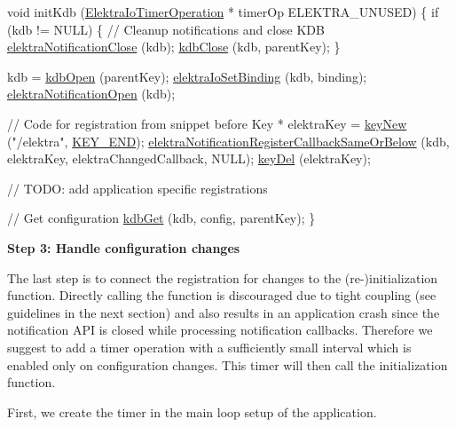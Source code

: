 \begin{DoxyCode}
\textcolor{keywordtype}{void} initKdb (\hyperlink{kdbio_8h_a09c40c890207a8244fc39bb930fee1fa}{ElektraIoTimerOperation} * timerOp ELEKTRA\_UNUSED)
\{
        \textcolor{keywordflow}{if} (kdb != NULL)
        \{
                \textcolor{comment}{// Cleanup notifications and close KDB}
                \hyperlink{group__kdbnotification_ga5685dafbd4131011365628d6d9213594}{elektraNotificationClose} (kdb);
                \hyperlink{group__kdb_gadb54dc9fda17ee07deb9444df745c96f}{kdbClose} (kdb, parentKey);
        \}

        kdb = \hyperlink{group__kdb_ga6808defe5870f328dd17910aacbdc6ca}{kdbOpen} (parentKey);
        \hyperlink{group__kdbio_ga187345483bdfbb404919c6797bc2db77}{elektraIoSetBinding} (kdb, binding);
        \hyperlink{group__kdbnotification_gaeae96154abdb5fdbf1b34a01e2b23e44}{elektraNotificationOpen} (kdb);

        \textcolor{comment}{// Code for registration from snippet before}
        Key * elektraKey = \hyperlink{group__key_gad23c65b44bf48d773759e1f9a4d43b89}{keyNew} (\textcolor{stringliteral}{"/elektra"}, \hyperlink{group__key_gga91fb3178848bd682000958089abbaf40aa8adb6fcb92dec58fb19410eacfdd403}{KEY\_END});
        \hyperlink{group__kdbnotification_ga374edd4f4fff527d6511ce4d0df62681}{elektraNotificationRegisterCallbackSameOrBelow} (kdb, 
      elektraKey, elektraChangedCallback, NULL);
        \hyperlink{group__key_ga3df95bbc2494e3e6703ece5639be5bb1}{keyDel} (elektraKey);

        \textcolor{comment}{// TODO: add application specific registrations}

        \textcolor{comment}{// Get configuration}
        \hyperlink{group__kdb_ga28e385fd9cb7ccfe0b2f1ed2f62453a1}{kdbGet} (kdb, config, parentKey);
\}
\end{DoxyCode}


{\bfseries Step 3\+: Handle configuration changes}

The last step is to connect the registration for changes to the (re-\/)initialization function. Directly calling the function is discouraged due to tight coupling (see guidelines in the next section) and also results in an application crash since the notification A\+PI is closed while processing notification callbacks. Therefore we suggest to add a timer operation with a sufficiently small interval which is enabled only on configuration changes. This timer will then call the initialization function.

First, we create the timer in the main loop setup of the application.


